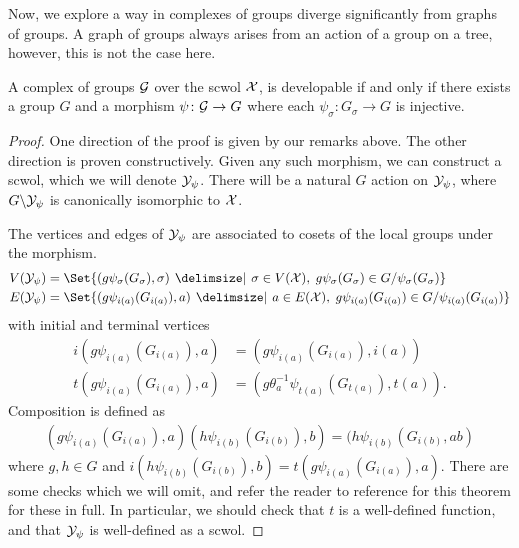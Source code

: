 Now, we explore a way in complexes of groups diverge significantly from graphs of groups.
A graph of groups always arises from an action of a group on a tree, however, this is not the case here.
\begin{theorem}
	A complex of groups $\mathcal{G}$ over the scwol $\mathcal{X}$, is developable if and only if there exists a group $G$ and a morphism $\psi \colon \mathcal{G} \to G$ where each $\psi_\sigma \colon G_\sigma \to G$ is injective.
	\label{thm:complex_of_groups_developable_iff_injective}
\end{theorem}
\begin{proof}
	One direction of the proof is given by our remarks above.
	The other direction is proven constructively.
	Given any such morphism, we can construct a scwol, which we will denote $\mathcal{Y}_\psi$.
	There will be a natural $G$ action on $\mathcal{Y}_\psi$, where $G \backslash \mathcal{Y}_\psi$ is canonically isomorphic to $\mathcal{X}$.

	The vertices and edges of $\mathcal{Y}_\psi$ are associated to cosets of the local groups under the morphism.
	\begin{align*}
		V(\caly_\psi) & = \Set{(g\psi_\sigma(G_\sigma), \sigma) \given \sigma \in V(\calx), \; g\psi_\sigma(G_\sigma) \in G / \psi_\sigma(G_\sigma)} \\
		E(\caly_\psi) & = \Set{(g\psi_{i(a)}(G_{i(a)}), a) \given a \in E(\calx), \; g\psi_{i(a)}(G_{i(a)}) \in G / \psi_{i(a)}(G_{i(a)})}
	\end{align*}
	with initial and terminal vertices
	\begin{align*}
		i(g\psi_{i(a)}(G_{i(a)}), a) & = (g\psi_{i(a)}(G_{i(a)}), i(a))              \\
		t(g\psi_{i(a)}(G_{i(a)}), a) & = (g\theta_a^{-1}\psi_{t(a)}(G_{t(a)}), t(a))
		.\end{align*}
	Composition is defined as
	\begin{align*}
		(g\psi_{i(a)}(G_{i(a)}), a)(h\psi_{i(b)}(G_{i(b)}), b) = (h\psi_{i(b)}(G_{i(b)}, ab)
	\end{align*}
	where $g,h \in G$ and $i(h\psi_{i(b)}(G_{i(b)}), b) = t(g\psi_{i(a)}(G_{i(a)}), a)$.
	There are some checks which we will omit, and refer the reader to reference for this theorem for these in full.
	In particular, we should check that $t$ is a well-defined function, and that $\mathcal{Y}_\psi$ is well-defined as a scwol.


\end{proof}
